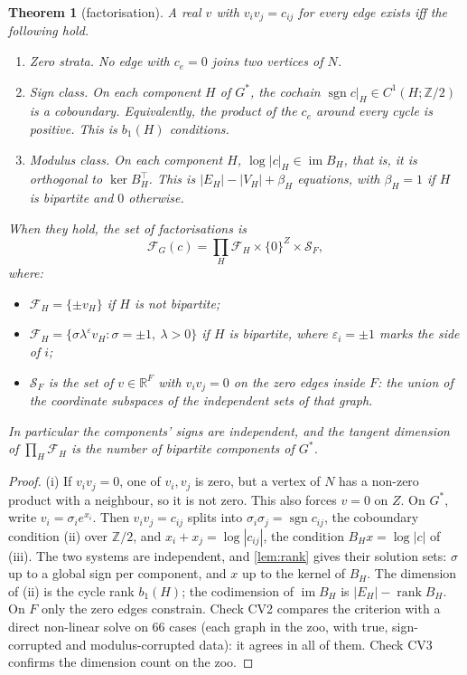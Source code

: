 \documentclass[11pt]{article}
\newtheorem{theorem}{Theorem}\newtheorem{proposition}[theorem]{Proposition}\newtheorem{lemma}[theorem]{Lemma}\newtheorem{corollary}[theorem]{Corollary}
\theoremstyle{definition}\newtheorem{definition}[theorem]{Definition}\newtheorem{remark}[theorem]{Remark}\newtheorem{example}[theorem]{Example}
\newcommand{\R}{\mathbb R}
\begin{document}
\begin{theorem}[factorisation]\label{thm:factor}
A real $v$ with $v_iv_j=c_{ij}$ for every edge exists iff the following hold.
\begin{enumerate}
\item[(i)] \emph{Zero strata.} No edge with $c_e=0$ joins two vertices of $N$.
\item[(ii)] \emph{Sign class.} On each component $H$ of $G^*$, the cochain $\operatorname{sgn}c|_H\in C^1(H;\mathbb Z/2)$ is a coboundary.
  Equivalently, the product of the $c_e$ around every cycle is positive. This is $b_1(H)$ conditions.
\item[(iii)] \emph{Modulus class.} On each component $H$, $\log|c|_H\in\operatorname{im}B_H$, that is, it is orthogonal to
  $\ker B_H^\top$. This is $|E_H|-|V_H|+\beta_H$ equations, with $\beta_H=1$ if $H$ is bipartite and $0$ otherwise.
\end{enumerate}
When they hold, the set of factorisations is
\[
\mathcal F_G(c)=\prod_{H}\mathcal F_H\times\{0\}^Z\times\mathcal S_F ,
\]
where:
\begin{itemize}
\item $\mathcal F_H=\{\pm v_H\}$ if $H$ is not bipartite;
\item $\mathcal F_H=\{\sigma\lambda^{\varepsilon}v_H:\sigma=\pm1,\ \lambda>0\}$ if $H$ is bipartite, where $\varepsilon_i=\pm1$ marks
  the side of $i$;
\item $\mathcal S_F$ is the set of $v\in\R^F$ with $v_iv_j=0$ on the zero edges inside $F$: the union of the coordinate subspaces of the
  independent sets of that graph.
\end{itemize}
In particular the components' signs are independent, and the tangent dimension of $\prod_H\mathcal F_H$ is the number of bipartite
components of $G^*$.
\end{theorem}

\begin{proof}
(i) If $v_iv_j=0$, one of $v_i,v_j$ is zero, but a vertex of $N$ has a non-zero product with a neighbour, so it is not zero. This also
forces $v=0$ on $Z$. On $G^*$, write $v_i=\sigma_i e^{x_i}$. Then $v_iv_j=c_{ij}$ splits into $\sigma_i\sigma_j=\operatorname{sgn}c_{ij}$,
the coboundary condition (ii) over $\mathbb Z/2$, and $x_i+x_j=\log|c_{ij}|$, the condition $B_Hx=\log|c|$ of (iii). The two systems
are independent, and \cref{lem:rank} gives their solution sets: $\sigma$ up to a global sign per component, and $x$ up to the kernel of
$B_H$. The dimension of (ii) is the cycle rank $b_1(H)$; the codimension of $\operatorname{im}B_H$ is $|E_H|-\operatorname{rank}B_H$.
On $F$ only the zero edges constrain. Check CV2 compares the criterion with a direct non-linear solve on $66$ cases (each graph in the
zoo, with true, sign-corrupted and modulus-corrupted data): it agrees in all of them. Check CV3 confirms the dimension count on the zoo.
\end{proof}
\end{document}

